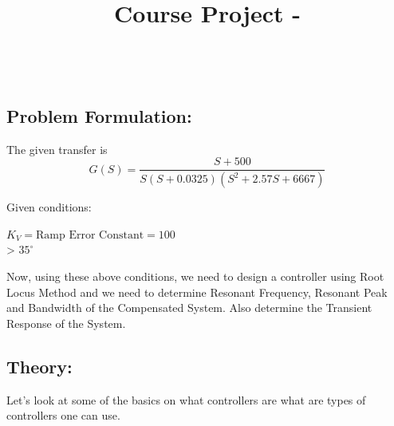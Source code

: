 \documentclass[12pt]{article}
\title{ 
  {\Large \textbf{\MakeUppercase{\projectTitle{}}}} \\
  {\large Course Project - \courseID} \vspace{-1em}
}
\author{
  {\large \studentName} \\
  {\large \studentRollNo}
}
\date{}
\begin{document}
\maketitle
\thispagestyle{fancy}

\subsection*{Problem Formulation:}
The given transfer is
\begin{equation}
  G(S) = \frac{S+500}{S(S+0.0325)(S^2 + 2.57S + 6667)}
\end{equation}

Given conditions:
\begin{center}
  \(K_V = \text{Ramp Error Constant} = 100 \) \\
   > \(35^\circ \)
\end{center}

Now, using these above conditions, we need to design a controller using Root Locus Method and we need to determine Resonant Frequency, Resonant Peak and Bandwidth of the Compensated System. Also determine the Transient Response of the System.

\subsection*{Theory:}
Let’s look at some of the basics on what controllers are what are types of controllers one can use.
  
\end{document}
